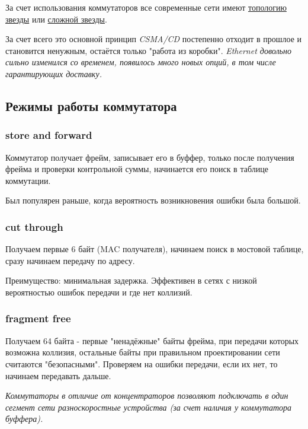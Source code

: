 \documentclass[a4paper,10pt]{article}
\begin{document}
	За счет использования коммутаторов все современные сети имеют \underline{топологию звезды} или \underline{сложной звезды}.
	
	За счет всего это основной принцип \emph{CSMA/CD} постепенно отходит в прошлое и становится ненужным, остаётся только "работа из коробки". \textit{Ethernet довольно сильно изменился со временем, появилось много новых опций, в том числе гарантирующих доставку.}
	
	\subsection{Режимы работы коммутатора}
	\subsubsection{store and forward}
	Коммутатор получает фрейм, записывает его в буффер, только после получения фрейма и проверки контрольной суммы, начинается его поиск в таблице коммутации.
	
	Был популярен раньше, когда вероятность возникновения ошибки была большой.
	
	\subsubsection{cut through}
	Получаем первые 6 байт (MAC получателя), начинаем поиск в мостовой таблице, сразу начинаем передачу по адресу.
	
	Преимущество: минимальная задержка. Эффективен в сетях с низкой вероятностью ошибок передачи и где нет коллизий.
	
	\subsubsection{fragment free}
	Получаем 64 байта - первые "ненадёжные" байты фрейма, при передачи которых возможна коллизия, остальные байты при правильном проектировании сети считаются "безопасными". Проверяем на ошибки передачи, если их нет, то начинаем передавать дальше.
	
	\textit{	Коммутаторы в отличие от концентраторов позволяют подключать в один сегмент сети разноскоростные устройства (за счет наличия у коммутатора буффера). }
	
	
\end{document}
